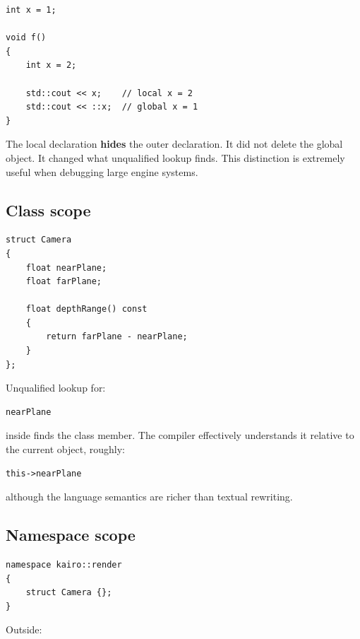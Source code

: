 \begin{verbatim}
int x = 1;

void f()
{
    int x = 2;

    std::cout << x;    // local x = 2
    std::cout << ::x;  // global x = 1
}
\end{verbatim}

The local declaration \textbf{hides} the outer declaration. It did not delete the global object. It changed what unqualified lookup finds. This distinction is extremely useful when debugging large engine systems.

\subsection{Class scope}\label{05-engine-i-ch002-class-scope}

\hypertarget{05-engine-i-ch002-class-scope}{}

\begin{verbatim}
struct Camera
{
    float nearPlane;
    float farPlane;

    float depthRange() const
    {
        return farPlane - nearPlane;
    }
};
\end{verbatim}

Unqualified lookup for:

\begin{verbatim}
nearPlane
\end{verbatim}

inside  finds the class member. The compiler effectively understands it relative to the current object, roughly:

\begin{verbatim}
this->nearPlane
\end{verbatim}

although the language semantics are richer than textual rewriting.

\subsection{Namespace scope}\label{05-engine-i-ch002-namespace-scope}

\hypertarget{05-engine-i-ch002-namespace-scope}{}

\begin{verbatim}
namespace kairo::render
{
    struct Camera {};
}
\end{verbatim}

Outside:

